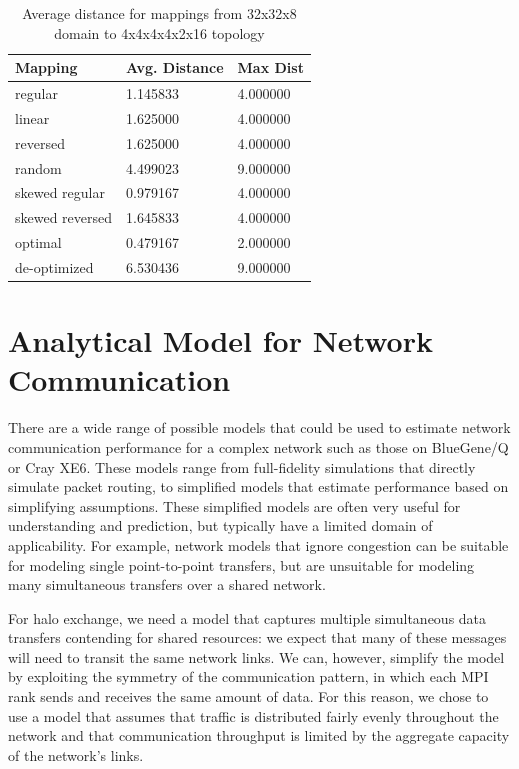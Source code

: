 \documentclass{acm_proc_article-sp}
\begin{document}
\begin{table}
  \caption{Average distance for mappings from 32x32x8 domain to 4x4x4x4x2x16 topology}
  {\footnotesize
    \begin{tabular}{| l | l | p{1.5cm} |}
    \hline
    Mapping         & Avg. Distance & Max Dist\\ \hline
    regular         & 1.145833 & 4.000000\\ \hline
    linear          & 1.625000 & 4.000000\\ \hline
    reversed        & 1.625000 & 4.000000\\ \hline
    random          & 4.499023 & 9.000000\\ \hline
    skewed regular  & 0.979167 & 4.000000\\ \hline
    skewed reversed & 1.645833 & 4.000000\\ \hline
    optimal         & 0.479167 & 2.000000\\ \hline
    de-optimized    & 6.530436 & 9.000000\\ \hline
    \hline
    \end{tabular}
  }
\end{table}


\section{Analytical Model for Network Communication}\label{sect:model}


There are a wide range of possible models that could be used to
estimate network communication performance for a complex network
such as those on BlueGene/Q or Cray XE6.  These models range from
full-fidelity simulations that directly simulate packet routing, to
simplified models that estimate performance based on simplifying
assumptions.  These simplified models are often very useful for
understanding and prediction, but typically have a limited domain
of applicability.  For example, network models that ignore congestion
can be suitable for modeling single point-to-point transfers, but are
unsuitable for modeling many simultaneous transfers over a shared network.

For halo exchange, we need a model that captures multiple
simultaneous data transfers contending for shared resources: we
expect that many of these messages will need to transit the
same network links.  We can, however, simplify the model by exploiting the
symmetry of the communication pattern, in which each MPI rank sends
and receives the same amount of data. For this reason, we chose to
use a model that assumes that traffic is distributed fairly evenly
throughout the network and that communication throughput is limited
by the aggregate capacity of the network's links. 
\end{document}

